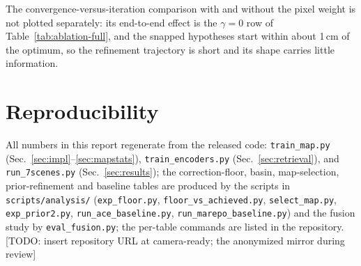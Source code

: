 \documentclass[journal]{IEEEtran}
\newcommand{\TODO}[1]{{\color{red}[TODO: #1]}}
\begin{document}
The convergence-versus-iteration comparison with and without the pixel
weight is not plotted separately: its end-to-end effect is the
$\gamma{=}0$ row of Table~\ref{tab:ablation-full}, and the snapped
hypotheses start within about 1\,cm of the optimum, so the refinement
trajectory is short and its shape carries little information.

\section*{Reproducibility}
All numbers in this report regenerate from the released code:
\texttt{train\_map.py} (Sec.~\ref{sec:impl}--\ref{sec:mapstats}),
\texttt{train\_encoders.py} (Sec.~\ref{sec:retrieval}), and
\texttt{run\_7scenes.py} (Sec.~\ref{sec:results}); the correction-floor, basin, map-selection, prior-refinement and baseline tables are produced by the scripts in \texttt{scripts/analysis/} (\texttt{exp\_floor.py}, \texttt{floor\_vs\_achieved.py}, \texttt{select\_map.py}, \texttt{exp\_prior2.py}, \texttt{run\_ace\_baseline.py}, \texttt{run\_marepo\_baseline.py}) and the fusion study by \texttt{eval\_fusion.py}; the per-table commands are listed in the repository. \TODO{insert repository URL at camera-ready; the
anonymized mirror during review}



\end{document}
